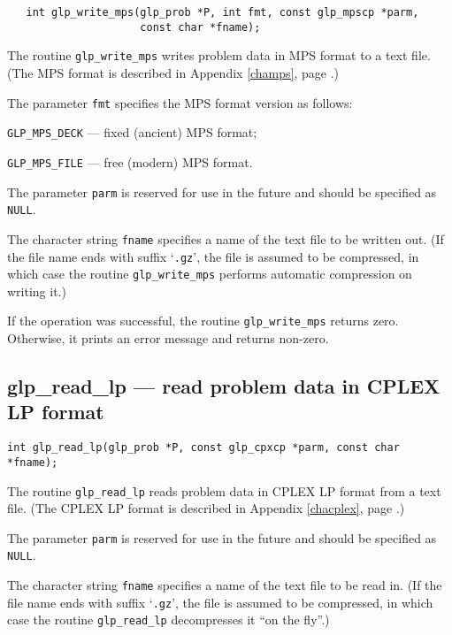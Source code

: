 \synopsis

\begin{verbatim}
   int glp_write_mps(glp_prob *P, int fmt, const glp_mpscp *parm,
                     const char *fname);
\end{verbatim}

\description

The routine \verb|glp_write_mps| writes problem data in MPS format to
a text file. (The MPS format is described in Appendix \ref{champs},
page \pageref{champs}.)

The parameter \verb|fmt| specifies the MPS format version as follows:

\verb|GLP_MPS_DECK| --- fixed (ancient) MPS format;

\verb|GLP_MPS_FILE| --- free (modern) MPS format.

The parameter \verb|parm| is reserved for use in the future and should
be specified as \verb|NULL|.

The character string \verb|fname| specifies a name of the text file to
be written out. (If the file name ends with suffix `\verb|.gz|', the
file is assumed to be compressed, in which case the routine
\verb|glp_write_mps| performs automatic compression on writing it.)

\returns

If the operation was successful, the routine \verb|glp_write_mps|
returns zero. Otherwise, it prints an error message and returns
non-zero.

\subsection{glp\_read\_lp --- read problem data in CPLEX LP format}

\synopsis

{\tt int glp\_read\_lp(glp\_prob *P, const glp\_cpxcp *parm,
const char *fname);}

\description

The routine \verb|glp_read_lp| reads problem data in CPLEX LP format
from a text file. (The CPLEX LP format is described in Appendix
\ref{chacplex}, page \pageref{chacplex}.)

The parameter \verb|parm| is reserved for use in the future and should
be specified as \verb|NULL|.

The character string \verb|fname| specifies a name of the text file to
be read in. (If the file name ends with suffix `\verb|.gz|', the file
is assumed to be compressed, in which case the routine
\verb|glp_read_lp| decompresses it ``on the fly''.)


